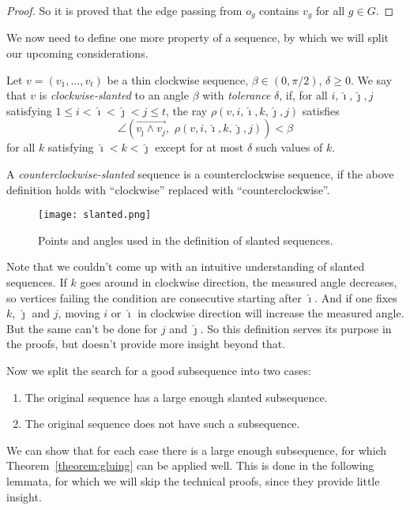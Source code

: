 \begin{proof}
  So it is proved that the edge passing from $o_g$ contains $v_g$ for all $g \in G$.
\end{proof}

We now need to define one more property of a sequence, by which we will split our upcoming considerations.

\begin{definition}
  Let $v=(v_1,\ldots,v_t)$ be a thin clockwise sequence, ${\beta\in(0,\pi/2)}$, $\delta\geq 0$. We say that $v$ is \emph{clockwise-slanted} to an angle $\beta$ with \emph{tolerance} $\delta$, if, for all $i,\hat{\imath},\hat{\jmath}, j$ satisfying $1\leq i<\hat{\imath}<\hat{\jmath}<j\leq t$, the ray ${\rho}(v,i,\hat{\imath},k,\hat{\jmath}, j)$ satisfies $$\angle\left(\overrightarrow{v_{\hat{\jmath}}\wedge v_j},\,\,\rho(v,i,\hat{\imath},k,\hat{\jmath}, j)\right)<\beta$$ for all $k$ satisfying $\hat{\imath}<k<\hat{\jmath}$ except for at most $\delta$ such values of $k$.

  A \emph{counterclockwise-slanted} sequence is a counterclockwise sequence, if the above definition holds with ``clockwise'' replaced with ``counterclockwise''.
\end{definition}

\begin{figure}[ht]
  \centering
  \texttt{[image: slanted.png]}
  \caption{Points and angles used in the definition of slanted sequences.}
  \label{fig:slanted}
\end{figure}

Note that we couldn't come up with an intuitive understanding of slanted sequences. If $k$ goes around in clockwise direction, the measured angle decreases, so vertices failing the condition are consecutive starting after $\hat{\imath}$. And if one fixes $k$, $\hat{\jmath}$ and $j$, moving $i$ or $\hat{\imath}$ in clockwise direction will increase the measured angle. But the same can't be done for $j$ and $\hat{\jmath}$. So this definition serves its purpose in the proofs, but doesn't provide more insight beyond that.

Now we split the search for a good subsequence into two cases:
\begin{enumerate}
  \item The original sequence has a large enough slanted subsequence.
  \item The original sequence does not have such a subsequence.
\end{enumerate}

We can show that for each case there is a large enough subsequence, for which Theorem~\ref{theorem:gluing} can be applied well. This is done in the following lemmata, for which we will skip the technical proofs, since they provide little insight.

